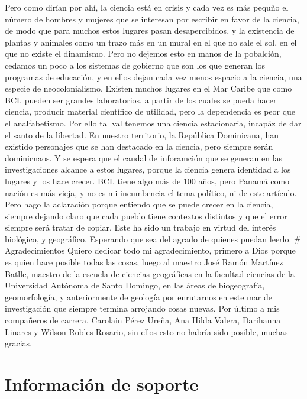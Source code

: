 \documentclass[11pt,]{article}
\begin{document}
Pero como dirían por ahí, la ciencia está en crisis y cada vez es más
pequño el número de hombres y mujeres que se interesan por escribir en
favor de la ciencia, de modo que para muchos estos lugares pasan
desapercibidos, y la existencia de plantas y animales como un trazo más
en un mural en el que no sale el sol, en el que no existe el dinamismo.
Pero no dejemos esto en manos de la pobalción, cedamos un poco a los
sistemas de gobierno que son los que generan los programas de educación,
y en ellos dejan cada vez menos espacio a la ciencia, una especie de
neocolonialismo. Existen muchos lugares en el Mar Caribe que como BCI,
pueden ser grandes laboratorios, a partir de los cuales se pueda hacer
ciencia, producir material científico de utilidad, pero la dependencia
es peor que el analfabetismo. Por ello tal val tenemos una ciencia
estacionaria, incapáz de dar el santo de la libertad. En nuestro
territorio, la República Dominicana, han existido personajes que se han
destacado en la ciencia, pero siempre serán dominicnaos. Y se espera que
el caudal de inforamción que se generan en las investigaciones alcance a
estos lugares, porque la ciencia genera identidad a los lugares y los
hace crecer. BCI, tiene algo más de 100 años, pero Panamá como nación es
más vieja, y no es mi incumbencia el tema político, ni de este artículo.
Pero hago la aclaración porque entiendo que se puede crecer en la
ciencia, siempre dejando claro que cada pueblo tiene contextos distintos
y que el error siempre será tratar de copiar. Este ha sido un trabajo en
virtud del interés biológico, y geográfico. Esperando que sea del agrado
de quienes puedan leerlo. \# Agradecimientos Quiero dedicar todo mi
agradecimiento, primero a Dios porque es quien hace posible todas las
cosas, luego al maestro José Ramón Martínez Batlle, maestro de la
escuela de ciencias geográficas en la facultad ciencias de la
Universidad Autónoma de Santo Domingo, en las áreas de biogeografía,
geomorfología, y anteriormente de geología por enrutarnos en este mar de
investigación que siempre termina arrojando cosas nuevas. Por último a
mis compañeros de carrera, Carolain Pérez Ureña, Ana Hilda Valera,
Darihanna Linares y Wilson Robles Rosario, sin ellos esto no habría sido
posible, muchas gracias.

\section{Información de soporte}\label{informaciuxf3n-de-soporte}
\end{document}

